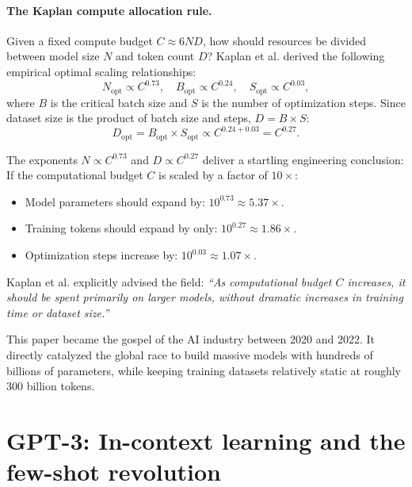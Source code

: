 \documentclass[../../main.tex]{subfiles}
\begin{document}
\paragraph{The Kaplan compute allocation rule.}
Given a fixed compute budget $C \approx 6ND$, how should resources be divided between model size $N$ and token count $D$?
Kaplan et al. derived the following empirical optimal scaling relationships:
\begin{equation}
\label{eq:kaplan_optimal_scaling}
N_{\text{opt}} \propto C^{0.73}, \quad B_{\text{opt}} \propto C^{0.24}, \quad S_{\text{opt}} \propto C^{0.03},
\end{equation}
where $B$ is the critical batch size and $S$ is the number of optimization steps. 
Since dataset size is the product of batch size and steps, $D = B \times S$:
\begin{equation}
\label{eq:kaplan_dataset_scaling}
D_{\text{opt}} = B_{\text{opt}} \times S_{\text{opt}} \propto C^{0.24 + 0.03} = C^{0.27}.
\end{equation}

\begin{intuition}
The exponents $N \propto C^{0.73}$ and $D \propto C^{0.27}$ deliver a startling engineering conclusion:
If the computational budget $C$ is scaled by a factor of $10\times$:
\begin{itemize}
    \item Model parameters should expand by: $10^{0.73} \approx 5.37\times$.
    \item Training tokens should expand by only: $10^{0.27} \approx 1.86\times$.
    \item Optimization steps increase by: $10^{0.03} \approx 1.07\times$.
\end{itemize}
Kaplan et al. explicitly advised the field: \emph{``As computational budget $C$ increases, it should be spent primarily on larger models, without dramatic increases in training time or dataset size.''}
\end{intuition}

This paper became the gospel of the AI industry between 2020 and 2022. It directly catalyzed the global race to build massive models with hundreds of billions of parameters, while keeping training datasets relatively static at roughly 300 billion tokens.

\section{GPT-3: In-context learning and the few-shot revolution}
\label{sec:gpt3_architecture}
\end{document}
